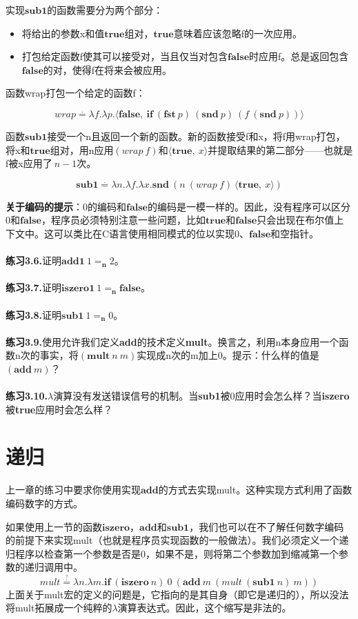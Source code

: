 \documentclass{book}
\def\n{\mathbf{n}}
\def\lianxi{\noindent \makebox[0pt][r]{$\rhd$} \textbf}
\begin{document}
实现$\mathbf{sub1}$的函数需要分为两个部分：
\begin{itemize}
 \item 将给出的参数x和值$\mathbf{true}$组对，$\mathbf{true}$意味着应该忽略f的一次应用。
 \item 打包给定函数f使其可以接受对，当且仅当对包含$\mathbf{false}$时应用f。总是返回包含$\mathbf{false}$的对，使得f在将来会被应用。
\end{itemize}
函数wrap打包一个给定的函数f：
\begin{framed}
 $$
 wrap\stackrel{.}{=}\lambda f.\lambda p.\langle \mathbf{false},\ \mathbf{if}\ (\mathbf{fst}\ p)\ (\mathbf{snd}\ p)\ (f\ (\mathbf{snd}\ p))\rangle 
 $$
\end{framed}
函数$\mathbf{sub1}$接受一个n且返回一个新的函数。新的函数接受f和x，将f用wrap打包，将x和$\mathbf{true}$组对，用n应用$(wrap\ f)$和$\langle \mathbf{true},\ x\rangle$并提取结果的第二部分——也就是f被x应用了$\ n-1$次。
\begin{framed}
 $$
 \mathbf{sub1}\stackrel{.}{=}\lambda n.\lambda f.\lambda x.\mathbf{snd}\ (n\ (wrap\ f)\ \langle \mathbf{true},\ x\rangle)
 $$
\end{framed}
\textbf{关于编码的提示}：0的编码和$\mathbf{false}$的编码是一模一样的。因此，没有程序可以区分0和$\mathbf{false}$，程序员必须特别注意一些问题，比如$\mathbf{true}$和$\mathbf{false}$只会出现在布尔值上下文中。这可以类比在C语言使用相同模式的位以实现0、$\mathbf{false}$和空指针。\\\\
\lianxi{练习3.6.}证明$\mathbf{add1}\ 1=_\n 2$。\\\\
\lianxi{练习3.7.}证明$\mathbf{iszero1}\ 1=_\n \mathbf{false}$。\\\\
\lianxi{练习3.8.}证明$\mathbf{sub1}\ 1=_\n 0$。\\\\
\lianxi{练习3.9.}使用允许我们定义\textbf{add}的技术定义\textbf{mult}。换言之，利用n本身应用一个函数n次的事实，将$(\mathbf{mult}\ n\ m)$实现成n次的m加上0。提示：什么样的值是$(\mathbf{add}\ m)$？\\\\
\lianxi{练习3.10.}$\lambda$演算没有发送错误信号的机制。当\textbf{sub1}被0应用时会怎么样？当\textbf{iszero}被\textbf{true}应用时会怎么样？
\section{递归}
上一章的练习中要求你使用实现$\mathbf{add}$的方式去实现mult。这种实现方式利用了函数编码数字的方式。\par
如果使用上一节的函数$\mathbf{iszero}$，$\mathbf{add}$和$\mathbf{sub1}$，我们也可以在不了解任何数字编码的前提下来实现mult（也就是程序员实现函数的一般做法）。我们必须定义一个递归程序以检查第一个参数是否是0，如果不是，则将第二个参数加到缩减第一个参数的递归调用中。
$$
mult\stackrel{\stackrel{?}{.}}{=}\lambda n.\lambda m.\mathbf{if}\ (\mathbf{iszero}\ n)\ 0\ (\mathbf{add}\ m\ (mult\ (\mathbf{sub1}\ n)\ m))
$$
上面关于mult宏的定义的问题是，它指向的是其自身（即它是递归的），所以没法将mult拓展成一个纯粹的$\lambda$演算表达式。因此，这个缩写是非法的。
\end{document}
